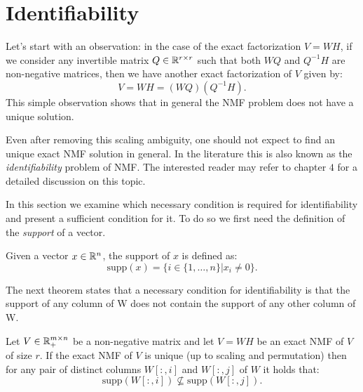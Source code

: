 \section{Identifiability}\label{identifiability section}
Let's start with an observation: in the case of the exact factorization $V = WH$, if we consider any invertible matrix $Q \in \mathbb{R}^{r \times r}$ such that both $WQ$ and $Q^{-1}H$ are non-negative matrices, then we have another exact factorization of $V$ given by:
\begin{equation}
    V = WH = (WQ)(Q^{-1}H).
\end{equation}
This simple observation shows that in general the NMF problem does not have a unique solution.
\par
Even after removing this scaling ambiguity, one should not expect to find an unique exact NMF solution in general.
In the literature this is also known as the \textit{identifiability} problem of NMF. The interested reader may refer to \cite{gillis2020nonnegative} chapter $4$ for a detailed discussion on this topic.
\par
In this section we examine which necessary condition is required for identifiability and present a sufficient condition for it.
To do so we first need the definition of the \textit{support} of a vector.
\begin{definition}
Given a vector $x \in \mathbb{R}^n$, the support of $x$ is defined as:
\begin{equation}
    \text{supp}(x) = \{ i \in \{1, \ldots, n\} | x_i \neq 0 \}.
\end{equation}
\end{definition}
The next theorem states that a necessary condition for identifiability is that the support of any column of W does not contain the support of any other column of W.
\begin{theorem}
\label{Necessary condition for identifiability}
Let $V \in \mathbb{R}_+^{m \times n}$ be a non-negative matrix and let $V = WH$ be an exact NMF of $V$ of size $r$.
If the exact NMF of $V$ is unique (up to scaling and permutation) then for any pair of distinct columns $W[:,i]$ and $W[:,j]$ of $W$ it holds that:
\begin{equation}
    \text{supp}(W[:,i]) \nsubseteq \text{supp}(W[:,j]).
\end{equation} 
\end{theorem}
